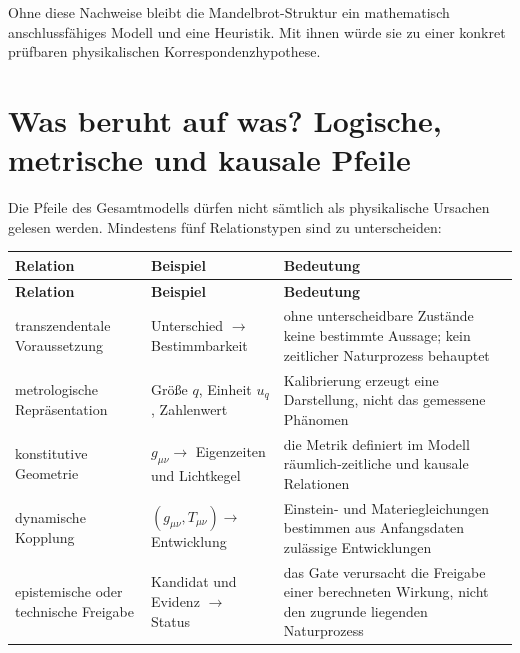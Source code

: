 \documentclass[11pt,a4paper]{article}
\theoremstyle{remark}
\begin{document}
Ohne diese Nachweise bleibt die Mandelbrot-Struktur ein mathematisch
anschlussfähiges Modell und eine Heuristik. Mit ihnen würde sie zu einer
konkret prüfbaren physikalischen Korrespondenzhypothese.

\section{Was beruht auf was? Logische, metrische und kausale Pfeile}
\label{sec:kausalkette}

Die Pfeile des Gesamtmodells dürfen nicht sämtlich als physikalische Ursachen
gelesen werden. Mindestens fünf Relationstypen sind zu unterscheiden:

\begin{longtable}{>{\raggedright\arraybackslash}p{}
                  >{\raggedright\arraybackslash}p{}
                  >{\raggedright\arraybackslash}p{}}
\toprule
\textbf{Relation} & \textbf{Beispiel} & \textbf{Bedeutung} \\
\midrule
\endfirsthead
\toprule
\textbf{Relation} & \textbf{Beispiel} & \textbf{Bedeutung} \\
\midrule
\endhead
transzendentale Voraussetzung & Unterschied \(\to\) Bestimmbarkeit & ohne unterscheidbare Zustände keine bestimmte Aussage; kein zeitlicher Naturprozess behauptet \\
metrologische Repräsentation & Größe \(q\), Einheit \(u_q\), Zahlenwert & Kalibrierung erzeugt eine Darstellung, nicht das gemessene Phänomen \\
konstitutive Geometrie & \(g_{\mu\nu}\to\) Eigenzeiten und Lichtkegel & die Metrik definiert im Modell räumlich-zeitliche und kausale Relationen \\
dynamische Kopplung & \((g_{\mu\nu},T_{\mu\nu})\to\) Entwicklung & Einstein- und Materiegleichungen bestimmen aus Anfangsdaten zulässige Entwicklungen \\
epistemische oder technische Freigabe & Kandidat und Evidenz \(\to\) Status & das Gate verursacht die Freigabe einer berechneten Wirkung, nicht den zugrunde liegenden Naturprozess \\
\bottomrule
\end{longtable}
\end{document}
